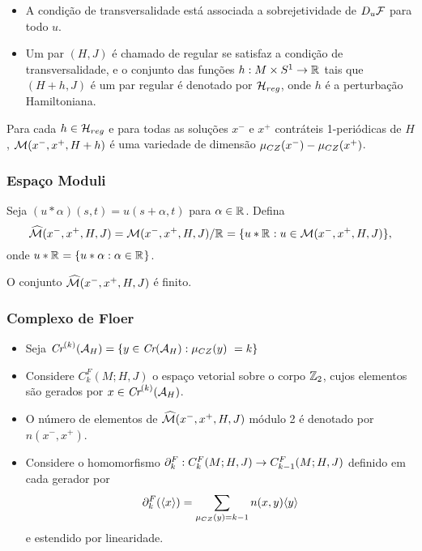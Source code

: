 \documentclass{beamer}
\begin{document}
\begin{footnotesize}
\begin{frame}
\begin{itemize}
			\item A condição de transversalidade está associada a sobrejetividade de $D_{u}\mathcal{F}$ para todo $u$.
			
			\item Um par $(H, J)$ é chamado de regular se satisfaz a condição de transversalidade, e o conjunto das funções $h:M\times S^{1} \to \mathbb{R}^{}$ tais que $(H+h,J)$ é um par regular é denotado por $\mathcal{H}_{reg}$, onde $h$ é a perturbação Hamiltoniana.
		\end{itemize}
		
		\begin{teorema}
			Para cada $h \in \mathcal{H}_{reg}$ e para todas as soluções $x^{-}$ e $x^{+}$ contráteis 1-periódicas de $H$, $\mathcal{M}(x^{-}, x^{+}, H+h)$ é uma variedade de dimensão $\mu_{CZ}(x^{-})-\mu_{CZ}(x^{+})$.
		\end{teorema}
	\end{frame}
	
	\begin{frame}
		\frametitle{Espaço Moduli}
		Seja $(u*\alpha)(s,t) = u(s+\alpha,t)$ para $\alpha \in \mathbb{R}^{}$.  Defina
		$$
		\widehat{\mathcal{M}}(x^{-}, x^{+}, H, J) = \mathcal{M}(x^{-},x^{+}, H, J)/\mathbb{R}^{}=\{u*\mathbb{R}^{}: u\in \mathcal{M}(x^{-},x^{+}, H, J)\},
		$$ 
		onde $u*\mathbb{R}^{} = \{u*\alpha:\alpha \in \mathbb{R}^{}\}$.
		
		\begin{teorema}
			O conjunto $\widehat{\mathcal{M}}(x^{-}, x^{+}, H, J)$ é finito.
		\end{teorema}
	\end{frame}
	
	\begin{frame}
		\frametitle{Complexo de Floer}
				
			\begin{itemize}
				\item Seja $
				\textit{Cr}^{(k)}(\mathcal{A}_{H}) = \{ y \in \textit{Cr}(\mathcal{A}_{H}): \mu_{CZ}(y) \ =	 k\}$
				
				\item Considere  $C^{F}_{k}(M;H,J)$ o espaço vetorial sobre o corpo $\mathbb{Z}_{2}$, cujos elementos são gerados por $x \in \textit{Cr}^{(k)}(\mathcal{A}_{H}) $.
				
				\item O número de elementos de $\widehat{\mathcal{M}}(x^{-}, x^{+}, H, J)$ módulo 2 é denotado por $n(x^{-},x^{+})$.
				
				\item 
				Considere o homomorfismo $\partial_{k}^{F}: C^{F}_{k}(M;H,J)\to C^{F}_{k-1}(M;H,J)$ definido em cada gerador por
				$$
				\partial_{k}^{F}(\langle x\rangle) = \sum_{\mu_{CZ}(y)=k-1}n(x,y)\langle y\rangle
				$$
				e estendido por linearidade. 
				

\end{itemize}
\end{frame}
\end{footnotesize}
\end{document}
